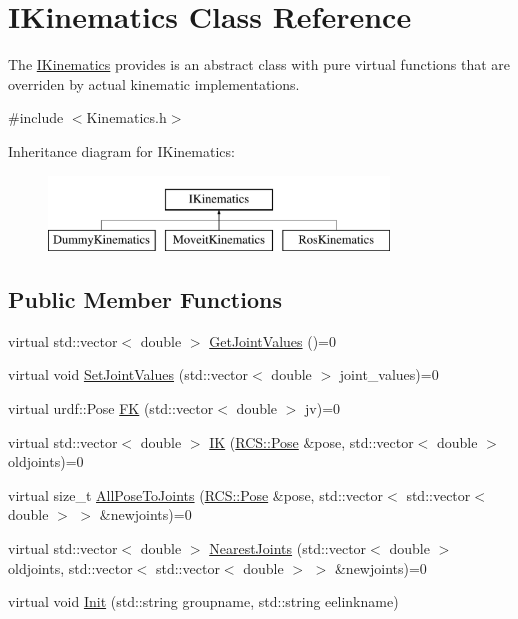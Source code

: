 \hypertarget{classIKinematics}{\section{I\-Kinematics Class Reference}
\label{classIKinematics}
}


The \hyperlink{classIKinematics}{I\-Kinematics} provides is an abstract class with pure virtual functions that are overriden by actual kinematic implementations.  




{\ttfamily \#include $<$Kinematics.\-h$>$}

Inheritance diagram for I\-Kinematics\-:\begin{figure}[H]
\begin{center}
\leavevmode
\includegraphics[height=2.000000cm]{classIKinematics}
\end{center}
\end{figure}
\subsection*{Public Member Functions}
\begin{DoxyCompactItemize}
\item 
virtual std\-::vector$<$ double $>$ \hyperlink{classIKinematics_af41a85f8dc0cac9d94f982c7cf58b475}{Get\-Joint\-Values} ()=0
\item 
virtual void \hyperlink{classIKinematics_ad43b2185f06e20eb0bf9d5a94d4aec18}{Set\-Joint\-Values} (std\-::vector$<$ double $>$ joint\-\_\-values)=0
\item 
virtual urdf\-::\-Pose \hyperlink{classIKinematics_a377f817ce25355513b518491436150fc}{F\-K} (std\-::vector$<$ double $>$ jv)=0
\item 
virtual std\-::vector$<$ double $>$ \hyperlink{classIKinematics_ad0715c776a7eb325d2543bc34fa8114f}{I\-K} (\hyperlink{namespaceRCS_aac02c0fd845140ea93a2a9254b1db6f6}{R\-C\-S\-::\-Pose} \&pose, std\-::vector$<$ double $>$ oldjoints)=0
\item 
virtual size\-\_\-t \hyperlink{classIKinematics_aeb53bb4b2a1e70a79d5d724e5eb82c10}{All\-Pose\-To\-Joints} (\hyperlink{namespaceRCS_aac02c0fd845140ea93a2a9254b1db6f6}{R\-C\-S\-::\-Pose} \&pose, std\-::vector$<$ std\-::vector$<$ double $>$ $>$ \&newjoints)=0
\item 
virtual std\-::vector$<$ double $>$ \hyperlink{classIKinematics_ab74b70ed6ecc53adfc36505b8dd1fef4}{Nearest\-Joints} (std\-::vector$<$ double $>$ oldjoints, std\-::vector$<$ std\-::vector$<$ double $>$ $>$ \&newjoints)=0
\item 
virtual void \hyperlink{classIKinematics_a1407620d6cf7f26e61a64af42d570b8f}{Init} (std\-::string groupname, std\-::string eelinkname)
\end{DoxyCompactItemize}


